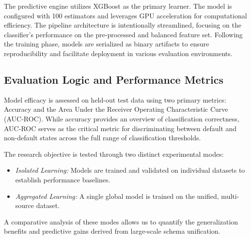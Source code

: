 \documentclass[onecolumn]{IEEEtai}
\begin{document}
The predictive engine utilizes XGBoost as the primary learner. The model is configured with 100 estimators and leverages GPU acceleration for computational efficiency. The pipeline architecture is intentionally streamlined, focusing on the classifier's performance on the pre-processed and balanced feature set. Following the training phase, models are serialized as binary artifacts to ensure reproducibility and facilitate deployment in various evaluation environments.

\subsection{Evaluation Logic and Performance Metrics}\vspace{-2pt}

Model efficacy is assessed on held-out test data using two primary metrics: Accuracy and the Area Under the Receiver Operating Characteristic Curve (AUC-ROC). While accuracy provides an overview of classification correctness, AUC-ROC serves as the critical metric for discriminating between default and non-default states across the full range of classification thresholds.

The research objective is tested through two distinct experimental modes:
\begin{itemize}
\item \emph{Isolated Learning:} Models are trained and validated on individual datasets to establish performance baselines.
\item \emph{Aggregated Learning:} A single global model is trained on the unified, multi-source dataset.
\end{itemize}
A comparative analysis of these modes allows us to quantify the generalization benefits and predictive gains derived from large-scale schema unification.
\end{document}
